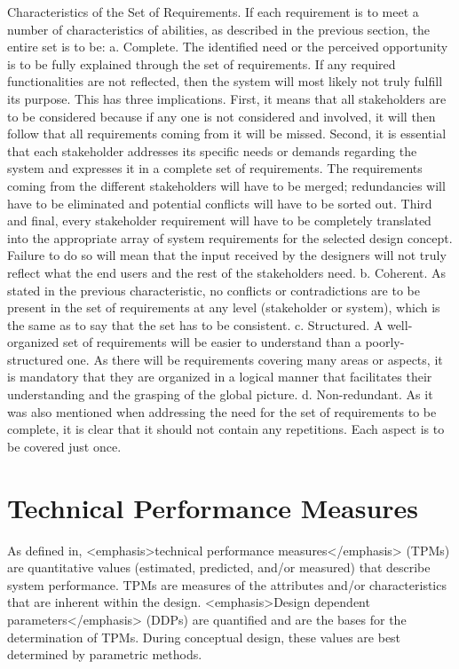 Characteristics of the Set of Requirements. 	If each requirement is to meet a number of characteristics of abilities, as described in the previous section, the entire set is to be:
    a. Complete. The identified need or the perceived opportunity is to be fully explained through the set of requirements. If any required functionalities are not reflected, then the system will most likely not truly fulfill its purpose. This has three implications. First, it means that all stakeholders are to be considered because if any one is not considered and involved, it will then follow that all requirements coming from it will be missed. Second, it is essential that each stakeholder addresses its specific needs or demands regarding the system and expresses it in a complete set of requirements. The requirements coming from the different stakeholders will have to be merged; redundancies will have to be eliminated and potential conflicts will have to be sorted out. Third and final, every stakeholder requirement will have to be completely translated into the appropriate array of system requirements for the selected design concept. Failure to do so will mean that the input received by the designers will not truly reflect what the end users and the rest of the stakeholders need.
    b. Coherent. As stated in the previous characteristic, no conflicts or contradictions are to be present in the set of requirements at any level (stakeholder or system), which is the same as to say that the set has to be consistent.
    c. Structured. A well-organized set of requirements will be easier to understand than a poorly-structured one. As there will be requirements covering many areas or aspects, it is mandatory that they are organized in a logical manner that facilitates their understanding and the grasping of the global picture.
    d. Non-redundant. As it was also mentioned when addressing the need for the set of requirements to be complete, it is clear that it should not contain any repetitions. Each aspect is to be covered just once.


\section{Technical Performance Measures}

As defined in, <emphasis>technical performance measures</emphasis> (TPMs) are quantitative values (estimated, predicted, and/or measured) that describe system performance. TPMs are measures of the attributes and/or characteristics that are inherent within the design. <emphasis>Design dependent parameters</emphasis> (DDPs) are quantified and are the bases for the determination of TPMs. During conceptual design, these values are best determined by parametric methods.

